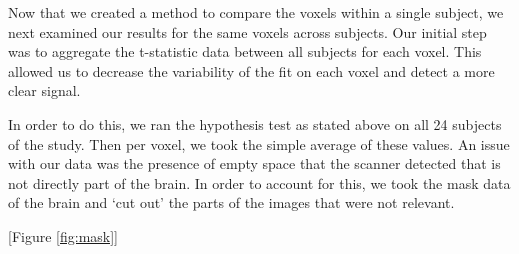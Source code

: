 	\par \indent Now that we created a method to compare the voxels within a single subject, we next examined our results for the same voxels across subjects. Our initial step was to aggregate the t-statistic data between all subjects for each voxel. This allowed us to decrease the variability of the fit on each voxel and detect a more clear signal. 

	\par \indent In order to do this, we ran the hypothesis test as stated above on all 24 subjects of the study. Then per voxel, we took the simple average of these values. An issue with our data was the presence of empty space that the scanner detected that is not directly part of the brain. In order to account for this, we took the mask data of the brain and ‘cut out’ the parts of the images that were not relevant. 

[Figure \ref{fig:mask}]
